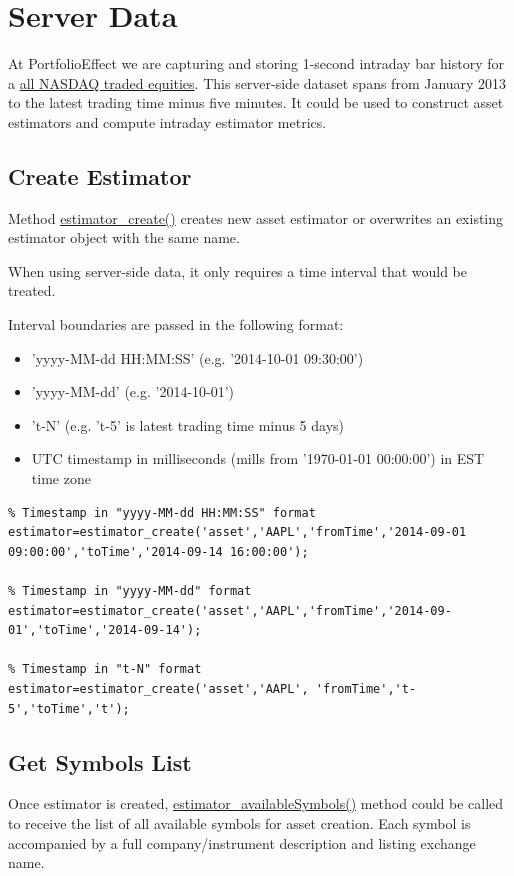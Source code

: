 \documentclass[letterpaper]{report}
\newcounter{N}
\begin{document}
\section{Server Data}
At PortfolioEffect we are capturing and storing 1-second intraday bar history for a 
\href{https://www.portfolioeffect.com/docs/symbology}{all NASDAQ traded
equities}.
This server-side dataset spans from January 2013 to the latest trading time minus five minutes. 
It could be used to construct asset estimators and compute intraday estimator metrics.
\subsection {Create Estimator}
Method
\href{https://www.portfolioeffect.com/docs/platform/quant/functions/general-functions/estimator-create}{estimator\_create()}
creates new asset estimator or overwrites an existing estimator object with the
same name. \par
When using server-side data, it only requires a time interval that would be treated.
\par
Interval boundaries are passed in the following format:
\begin{itemize} 
  \item 'yyyy-MM-dd HH:MM:SS' (e.g. '2014-10-01 09:30:00')
  \item 'yyyy-MM-dd' (e.g. '2014-10-01')
  \item 't-N' (e.g. 't-5' is latest trading time minus 5 days)
  \item UTC timestamp in milliseconds (mills from '1970-01-01 00:00:00') in EST
  time zone
\end{itemize}
\begin{lstlisting}
% Timestamp in "yyyy-MM-dd HH:MM:SS" format
estimator=estimator_create('asset','AAPL','fromTime','2014-09-01 09:00:00','toTime','2014-09-14 16:00:00');

% Timestamp in "yyyy-MM-dd" format
estimator=estimator_create('asset','AAPL','fromTime','2014-09-01','toTime','2014-09-14');

% Timestamp in "t-N" format
estimator=estimator_create('asset','AAPL', 'fromTime','t-5','toTime','t');
\end{lstlisting}

\subsection {Get Symbols List}
Once estimator is created, 
\href{https://www.portfolioeffect.com/docs/platform/quant/functions/general-functions/estimator-available-symbols}{estimator\_availableSymbols()} 
method could be called to receive the list of all available symbols for asset creation. 
Each symbol is accompanied by a full company/instrument description and listing exchange name.
\end{document}
